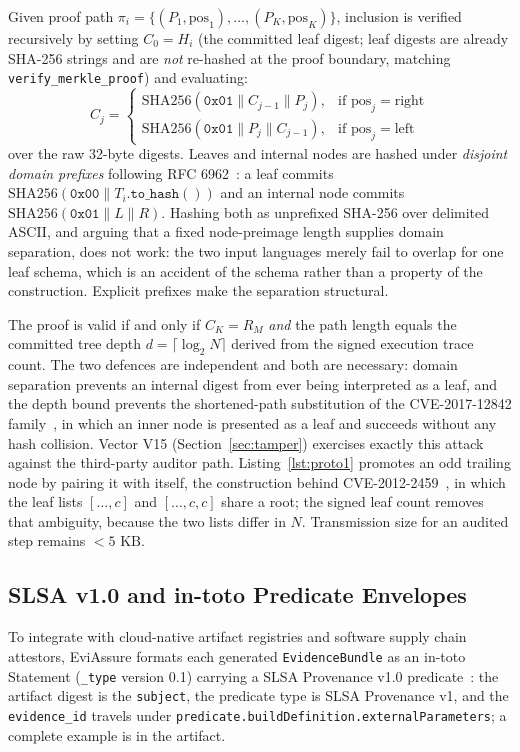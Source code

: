 \documentclass[letterpaper,10pt,twocolumn]{article}
\theoremstyle{definition}
\begin{document}
Given proof path $\pi_i = \{(P_1, \text{pos}_1), \dots, (P_K, \text{pos}_K)\}$, inclusion is verified recursively by setting $C_0 = H_i$ (the committed leaf digest; leaf digests are already SHA-256 strings and are \emph{not} re-hashed at the proof boundary, matching \nolinkurl{verify_merkle_proof}) and evaluating:
\begin{equation}
C_j = \begin{cases}
\text{SHA256}(\texttt{0x01} \parallel C_{j-1} \parallel P_j), & \text{if } \text{pos}_j = \text{right} \\
\text{SHA256}(\texttt{0x01} \parallel P_j \parallel C_{j-1}), & \text{if } \text{pos}_j = \text{left}
\end{cases}
\end{equation}
over the raw 32-byte digests. Leaves and internal nodes are hashed under \emph{disjoint domain prefixes} following RFC 6962~\cite{laurie2014certificate}: a leaf commits $\text{SHA256}(\texttt{0x00} \parallel T_i.\texttt{to\_hash}())$ and an internal node commits $\text{SHA256}(\texttt{0x01} \parallel L \parallel R)$. Hashing both as unprefixed SHA-256 over delimited ASCII, and arguing that a fixed node-preimage length supplies domain separation, does not work: the two input languages merely fail to overlap for one leaf schema, which is an accident of the schema rather than a property of the construction. Explicit prefixes make the separation structural.

The proof is valid if and only if $C_K = R_M$ \emph{and} the path length equals the committed tree depth $d=\lceil\log_2 N\rceil$ derived from the signed execution trace count. The two defences are independent and both are necessary: domain separation prevents an internal digest from ever being interpreted as a leaf, and the depth bound prevents the shortened-path substitution of the \mbox{CVE-2017-12842} family~\cite{cve201712842}, in which an inner node is presented as a leaf and succeeds without any hash collision. Vector V15 (Section~\ref{sec:tamper}) exercises exactly this attack against the third-party auditor path. Listing~\ref{lst:proto1} promotes an odd trailing node by pairing it with itself, the construction behind \mbox{CVE-2012-2459}~\cite{cve20122459}, in which the leaf lists $[\ldots,c]$ and $[\ldots,c,c]$ share a root; the signed leaf count removes that ambiguity, because the two lists differ in $N$. Transmission size for an audited step remains $<5\text{ KB}$.


\subsection{SLSA v1.0 and in-toto Predicate Envelopes}
To integrate with cloud-native artifact registries and software supply chain attestors, EviAssure formats each generated \texttt{EvidenceBundle} as an in-toto Statement (\texttt{\_type} version 0.1) carrying a SLSA Provenance v1.0 predicate~\cite{torres2019in-toto, slsa2023supply}: the artifact digest is the \texttt{subject}, the predicate type is SLSA Provenance v1, and the \texttt{evidence\_id} travels under \nolinkurl{predicate.buildDefinition.externalParameters}; a complete example is in the artifact.
\end{document}
